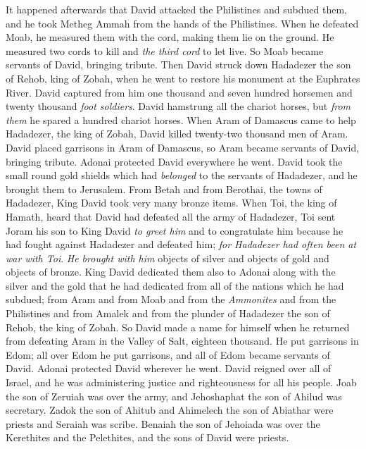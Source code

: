 \begin{biblechapter} %
 It happened afterwards that David attacked the Philistines and subdued them, and he took Metheg Ammah from the hands of the Philistines.
\verse When he defeated Moab, he measured them with the cord, making them lie on the ground. He measured two cords to kill and \textit{the third cord} to let live. So Moab became servants of David, bringing tribute.
\verse Then David struck down Hadadezer the son of Rehob, king of Zobah, when he went to restore his monument at the Euphrates River.
\verse David captured from him one thousand and seven hundred horsemen and twenty thousand \textit{foot soldiers}. David hamstrung all the chariot horses, but \textit{from them} he spared a hundred chariot horses.
\verse When Aram of Damascus came to help Hadadezer, the king of Zobah, David killed twenty-two thousand men of Aram.
\verse David placed garrisons in Aram of Damascus, so Aram became servants of David, bringing tribute. Adonai protected David everywhere he went.
\verse David took the small round gold shields which had \textit{belonged} to the servants of Hadadezer, and he brought them to Jerusalem.
\verse From Betah and from Berothai, the towns of Hadadezer, King David took very many bronze items.
\verse When Toi, the king of Hamath, heard that David had defeated all the army of Hadadezer,
\verse Toi sent Joram his son to King David \textit{to greet him} and to congratulate him because he had fought against Hadadezer and defeated him; \textit{for Hadadezer had often been at war with Toi}. \textit{He brought with him} objects of silver and objects of gold and objects of bronze.
\verse King David dedicated them also to Adonai along with the silver and the gold that he had dedicated from all of the nations which he had subdued;
\verse from Aram and from Moab and from the \textit{Ammonites} and from the Philistines and from Amalek and from the plunder of Hadadezer the son of Rehob, the king of Zobah.
\verse So David made a name for himself when he returned from defeating Aram in the Valley of Salt, eighteen thousand.
\verse He put garrisons in Edom; all over Edom he put garrisons, and all of Edom became servants of David. Adonai protected David wherever he went.
\verse David reigned over all of Israel, and he was administering justice and righteousness for all his people.
\verse Joab the son of Zeruiah was over the army, and Jehoshaphat the son of Ahilud was secretary.
\verse Zadok the son of Ahitub and Ahimelech the son of Abiathar were priests and Seraiah was scribe.
\verse Benaiah the son of Jehoiada was over the Kerethites and the Pelethites, and the sons of David were priests.
\end{biblechapter}

